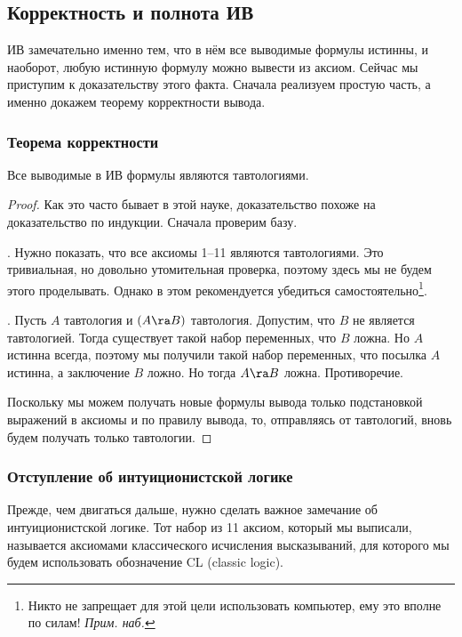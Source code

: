 \documentclass[a4paper,draft]{article}
\begin{document}
\subsection{Корректность и полнота ИВ}

ИВ замечательно именно тем,
что в нём все выводимые формулы истинны, и наоборот, любую истинную формулу можно вывести
из аксиом. Сейчас мы приступим к доказательству этого факта.
Сначала реализуем простую часть, а именно докажем теорему корректности вывода.

\subsubsection{Теорема корректности}

\begin{theorem}
  Все выводимые в ИВ формулы являются тавтологиями.
\end{theorem}
\begin{proof}
  Как это часто бывает в этой науке, доказательство похоже на доказательство по индукции.
  Сначала проверим базу.

  . Нужно показать, что все аксиомы 1--11 являются тавтологиями. Это тривиальная, но довольно утомительная проверка,
  поэтому здесь мы не будем этого проделывать. Однако в этом рекомендуется убедиться самостоятельно\footnote{Никто не запрещает для
  этой цели использовать компьютер, ему это вполне по силам! \emph{Прим. наб.}}.

  . Пусть $A$ тавтология и $(A \ra B)$ тавтология. Допустим, что $B$ не является тавтологией.
  Тогда существует такой набор переменных, что $B$ ложна. Но $A$ истинна всегда,
  поэтому мы получили такой набор переменных, что посылка $A$ истинна, а заключение $B$ ложно.
  Но тогда $A \ra B$ ложна. Противоречие.

  Поскольку мы можем получать новые формулы вывода только подстановкой выражений в аксиомы и по правилу
  вывода, то, отправляясь от тавтологий, вновь будем получать только тавтологии.
\end{proof}

\subsubsection{Отступление об интуиционистской логике}

Прежде, чем двигаться дальше, нужно сделать важное замечание об интуиционистской логике.
Тот набор из 11 аксиом, который мы выписали, называется аксиомами классического исчисления высказываний,
для которого мы будем использовать обозначение CL (classic logic).
\end{document}
